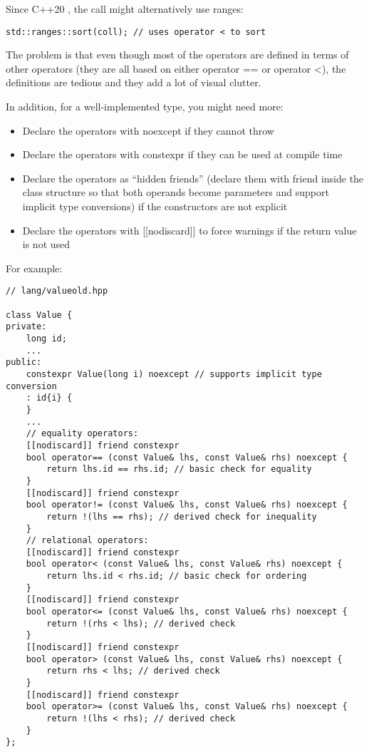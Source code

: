 Since C++20 , the call might alternatively use ranges:

\begin{lstlisting}[style=styleCXX]
std::ranges::sort(coll); // uses operator < to sort
\end{lstlisting}

The problem is that even though most of the operators are defined in terms of other operators (they are all based on either operator == or operator <), the definitions are tedious and they add a lot of visual clutter.

In addition, for a well-implemented type, you might need more:

\begin{itemize}
\item
Declare the operators with noexcept if they cannot throw

\item
Declare the operators with constexpr if they can be used at compile time

\item
Declare the operators as “hidden friends” (declare them with friend inside the class structure so that both operands become parameters and support implicit type conversions) if the constructors are not explicit

\item
Declare the operators with [[nodiscard]] to force warnings if the return value is not used
\end{itemize}

For example:

\begin{lstlisting}[style=styleCXX]
// lang/valueold.hpp

class Value {
private:
	long id;
	...
public:
	constexpr Value(long i) noexcept // supports implicit type conversion
	: id{i} {
	}
	...
	// equality operators:
	[[nodiscard]] friend constexpr
	bool operator== (const Value& lhs, const Value& rhs) noexcept {
		return lhs.id == rhs.id; // basic check for equality
	}
	[[nodiscard]] friend constexpr
	bool operator!= (const Value& lhs, const Value& rhs) noexcept {
		return !(lhs == rhs); // derived check for inequality
	}
	// relational operators:
	[[nodiscard]] friend constexpr
	bool operator< (const Value& lhs, const Value& rhs) noexcept {
		return lhs.id < rhs.id; // basic check for ordering
	}
	[[nodiscard]] friend constexpr
	bool operator<= (const Value& lhs, const Value& rhs) noexcept {
		return !(rhs < lhs); // derived check
	}
	[[nodiscard]] friend constexpr
	bool operator> (const Value& lhs, const Value& rhs) noexcept {
		return rhs < lhs; // derived check
	}
	[[nodiscard]] friend constexpr
	bool operator>= (const Value& lhs, const Value& rhs) noexcept {
		return !(lhs < rhs); // derived check
	}
};
\end{lstlisting}

